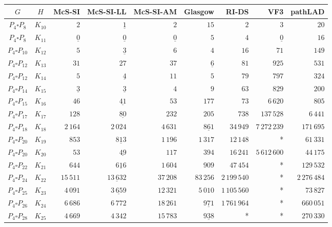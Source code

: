 
\begin{tabular}{ccrrrrrrr}
    \toprule
    {$G$} & {$H$} & {McS-SI} & {McS-SI-LL} & {McS-SI-AM} & Glasgow & RI-DS & VF3 & pathLAD \\ 
    \midrule

$P_4\square P_{8}$ & $K_{10}$ & $2$ & $\underline{1}$ & $2$ & $15$ & $2$ & $3$ & $20$\\
$P_4\square P_{8}$ & $K_{11}$ & $\underline{0}$ & $\underline{0}$ & $\underline{0}$ & $5$ & $4$ & $\underline{0}$ & $16$\\
$P_4\square P_{10}$ & $K_{12}$ & $5$ & $\underline{3}$ & $6$ & $4$ & $16$ & $71$ & $149$\\
$P_4\square P_{12}$ & $K_{13}$ & $31$ & $27$ & $37$ & $\underline{6}$ & $81$ & $925$ & $531$\\
$P_4\square P_{12}$ & $K_{14}$ & $5$ & $\underline{4}$ & $11$ & $5$ & $79$ & $797$ & $324$\\
$P_4\square P_{14}$ & $K_{15}$ & $\underline{3}$ & $\underline{3}$ & $4$ & $9$ & $63$ & $829$ & $200$\\
$P_4\square P_{15}$ & $K_{16}$ & $46$ & $\underline{41}$ & $53$ & $177$ & $73$ & $6\,620$ & $805$\\
$P_4\square P_{17}$ & $K_{17}$ & $128$ & $\underline{80}$ & $232$ & $205$ & $738$ & $137\,528$ & $6\,441$\\
$P_4\square P_{18}$ & $K_{18}$ & $2\,164$ & $2\,024$ & $4\,631$ & $\underline{861}$ & $34\,949$ & $7\,272\,239$ & $171\,695$\\
$P_4\square P_{20}$ & $K_{19}$ & $853$ & $\underline{813}$ & $1\,196$ & $1\,317$ & $12\,148$ & * & $61\,331$\\
$P_4\square P_{20}$ & $K_{20}$ & $53$ & $\underline{49}$ & $117$ & $394$ & $16\,241$ & $5\,612\,600$ & $44\,175$\\
$P_4\square P_{22}$ & $K_{21}$ & $644$ & $\underline{616}$ & $1\,604$ & $909$ & $47\,454$ & * & $129\,532$\\
$P_4\square P_{24}$ & $K_{22}$ & $15\,511$ & $\underline{13\,632}$ & $37\,208$ & $83\,256$ & $2\,199\,540$ & * & $2\,276\,484$\\
$P_4\square P_{25}$ & $K_{23}$ & $4\,091$ & $\underline{3\,659}$ & $12\,321$ & $5\,010$ & $1\,105\,560$ & * & $73\,827$\\
$P_4\square P_{26}$ & $K_{24}$ & $6\,686$ & $6\,772$ & $18\,261$ & $\underline{971}$ & $1\,761\,964$ & * & $660\,051$\\
$P_4\square P_{28}$ & $K_{25}$ & $4\,669$ & $4\,342$ & $15\,783$ & $\underline{938}$ & * & * & $270\,330$\\

\end{tabular}

